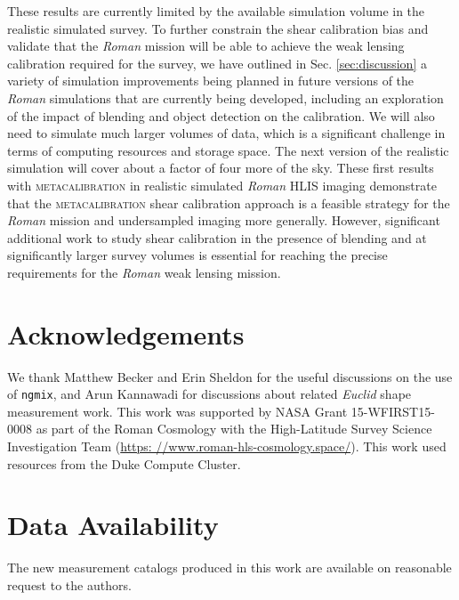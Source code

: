 \documentclass[fleqn,usenatbib]{mnras}
\begin{document}
These results are currently limited by the available simulation volume in the realistic simulated survey. To further constrain the shear calibration bias and validate that the \emph{Roman} mission will be able to achieve the weak lensing calibration required for the survey, we have outlined in Sec. \ref{sec:discussion} a variety of simulation improvements being planned in future versions of the \emph{Roman} simulations that are currently being developed, including an exploration of the impact of blending and object detection on the calibration. We will also need to simulate much larger volumes of data, which is a significant challenge in terms of computing resources and storage space. The next version of the realistic simulation will cover about a factor of four more of the sky. These first results with \textsc{metacalibration} in realistic simulated \emph{Roman} HLIS imaging demonstrate that the \textsc{metacalibration} shear calibration approach is a feasible strategy for the \emph{Roman} mission and undersampled imaging more generally. However, significant additional work to study shear calibration in the presence of blending and at significantly larger survey volumes is essential for reaching the precise requirements for the \emph{Roman} weak lensing mission. 

\section{Acknowledgements}

We thank Matthew Becker and Erin Sheldon for the useful discussions on the use of \texttt{ngmix}, and Arun Kannawadi for discussions about related \emph{Euclid} shape measurement work. This work was supported by NASA Grant 15-WFIRST15-0008 as part of the Roman Cosmology with the High-Latitude Survey Science Investigation Team (\url{https: //www.roman-hls-cosmology.space/}). This work used resources from the Duke Compute Cluster.

\section*{Data Availability}

 
The new measurement catalogs produced in this work are available on reasonable request to the authors.





\end{document}
